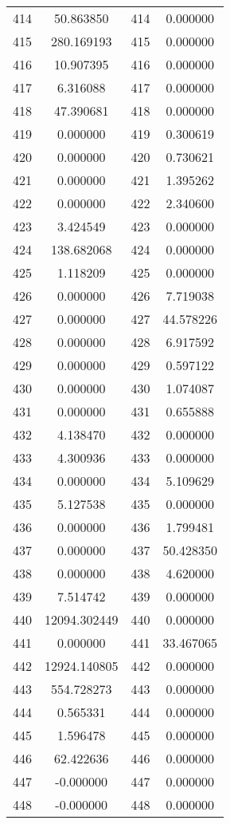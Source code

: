 \documentclass[12pt]{article}
\begin{document}
\begin{longtable}{@{}cccc@{}}
414 & 50.863850 & 414 & 0.000000 \\
415 & 280.169193 & 415 & 0.000000 \\
416 & 10.907395 & 416 & 0.000000 \\
417 & 6.316088 & 417 & 0.000000 \\
418 & 47.390681 & 418 & 0.000000 \\
419 & 0.000000 & 419 & 0.300619 \\
420 & 0.000000 & 420 & 0.730621 \\
421 & 0.000000 & 421 & 1.395262 \\
422 & 0.000000 & 422 & 2.340600 \\
423 & 3.424549 & 423 & 0.000000 \\
424 & 138.682068 & 424 & 0.000000 \\
425 & 1.118209 & 425 & 0.000000 \\
426 & 0.000000 & 426 & 7.719038 \\
427 & 0.000000 & 427 & 44.578226 \\
428 & 0.000000 & 428 & 6.917592 \\
429 & 0.000000 & 429 & 0.597122 \\
430 & 0.000000 & 430 & 1.074087 \\
431 & 0.000000 & 431 & 0.655888 \\
432 & 4.138470 & 432 & 0.000000 \\
433 & 4.300936 & 433 & 0.000000 \\
434 & 0.000000 & 434 & 5.109629 \\
435 & 5.127538 & 435 & 0.000000 \\
436 & 0.000000 & 436 & 1.799481 \\
437 & 0.000000 & 437 & 50.428350 \\
438 & 0.000000 & 438 & 4.620000 \\
439 & 7.514742 & 439 & 0.000000 \\
440 & 12094.302449 & 440 & 0.000000 \\
441 & 0.000000 & 441 & 33.467065 \\
442 & 12924.140805 & 442 & 0.000000 \\
443 & 554.728273 & 443 & 0.000000 \\
444 & 0.565331 & 444 & 0.000000 \\
445 & 1.596478 & 445 & 0.000000 \\
446 & 62.422636 & 446 & 0.000000 \\
447 & -0.000000 & 447 & 0.000000 \\
448 & -0.000000 & 448 & 0.000000 \\

\end{longtable}
\end{document}
